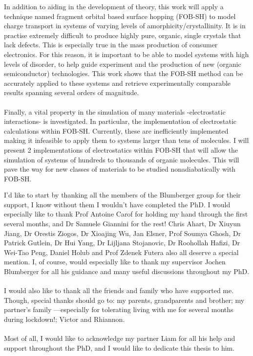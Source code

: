 In addition to aiding in the development of theory, this work will apply a technique named fragment orbital based surface hopping (FOB-SH) to model charge transport in systems of varying levels of amorphicity/crystallinity. It is in practise extremely difficult to produce highly pure, organic, single crystals that lack defects. This is especially true in the mass production of consumer electronics. For this reason, it is important to be able to model systems with high levels of disorder, to help guide experiment and the production of new (organic semiconductor) technologies. This work shows that the FOB-SH method can be accurately applied to these systems and retrieve experimentally comparable results spanning several orders of magnitude.
\\\\
Finally, a vital property in the simulation of many materials -electrostatic interactions- is investigated. In particular, the implementation of electrostatic calculations within FOB-SH. Currently, these are inefficiently implemented making it infeasible to apply them to systems larger than tens of molecules. I will present 2 implementations of electrostatics within FOB-SH that will allow the simulation of systems of hundreds to thousands of organic molecules.  This will pave the way for new classes of materials to be studied nonadiabatically with FOB-SH.


\begin{acknowledgements}
I'd like to start by thanking all the members of the Blumberger group for their support, I know without them I wouldn't have completed the PhD. I would especially like to thank Prof Antoine Carof for holding my hand through the first several months, and Dr Samuele Giannini for the rest! Chris Ahart, Dr Xiuyun Jiang, Dr Orestis Ziogos, Dr Xioajing Wu, Jan Elsner, Prof Soumya Ghosh, Dr Patrick Gutlein, Dr Hui Yang, Dr Lijljana Stojanovic, Dr Roohollah Hafizi, Dr Wei-Tao Peng, Daniel Holub and Prof Zdenek Futera also all deserve a special mention. I, of course, would especially like to thank my supervisor Jochen Blumberger for all his guidance and many useful discussions throughout my PhD.
\\\\
I would also like to thank all the friends and family who have supported me. Though, special thanks should go to: my parents, grandparents and brother; my partner's family ---especially for tolerating  living with me for several months during lockdown!; Victor and Rhiannon.
\\\\
Most of all, I would like to acknowledge my partner Liam for all his help and support throughout the PhD, and I would like to dedicate this thesis to him.
\end{acknowledgements}

\setcounter{tocdepth}{2} 

\tableofcontents
\listoffigures
\listoftables


